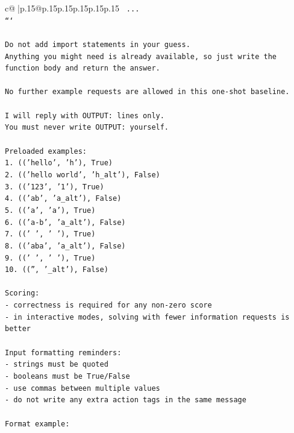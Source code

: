 \documentclass{article}
\begin{document}
{\begin{supertabular}{c@{$\;$}|p{.15\linewidth}@{}p{.15\linewidth}p{.15\linewidth}p{.15\linewidth}p{.15\linewidth}p{.15\linewidth}}
{{{\texttt{    ...} \\
\texttt{```} \\
\\ 
\texttt{Do not add import statements in your guess.} \\
\texttt{Anything you might need is already available, so just write the function body and return the answer.} \\
\\ 
\texttt{No further example requests are allowed in this one{-}shot baseline.} \\
\\ 
\texttt{I will reply with OUTPUT: lines only.} \\
\texttt{You must never write OUTPUT: yourself.} \\
\\ 
\texttt{Preloaded examples:} \\
\texttt{1. (('hello', 'h'), True)} \\
\texttt{2. (('hello world', 'h\_alt'), False)} \\
\texttt{3. (('123', '1'), True)} \\
\texttt{4. (('ab', 'a\_alt'), False)} \\
\texttt{5. (('a', 'a'), True)} \\
\texttt{6. (('a{-}b', 'a\_alt'), False)} \\
\texttt{7. ((' ', ' '), True)} \\
\texttt{8. (('aba', 'a\_alt'), False)} \\
\texttt{9. (('   ', ' '), True)} \\
\texttt{10. (('', '\_alt'), False)} \\
\\ 
\texttt{Scoring:} \\
\texttt{{-} correctness is required for any non{-}zero score} \\
\texttt{{-} in interactive modes, solving with fewer information requests is better} \\
\\ 
\texttt{Input formatting reminders:} \\
\texttt{{-} strings must be quoted} \\
\texttt{{-} booleans must be True/False} \\
\texttt{{-} use commas between multiple values} \\
\texttt{{-} do not write any extra action tags in the same message} \\
\\ 
\texttt{Format example:} \\
}}}
\end{supertabular}}
\end{document}
